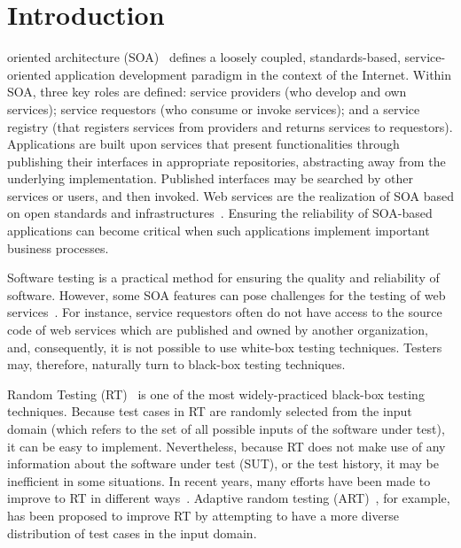 \documentclass[10pt,journal,compsoc]{IEEEtran}
\begin{document}
\maketitle

\IEEEdisplaynontitleabstractindextext


\IEEEpeerreviewmaketitle


\section{Introduction}
\label{sec:introduction}

 oriented architecture (SOA)~\cite{papazoglou2008service} defines a loosely coupled, standards-based, service-oriented application development paradigm in the context of the Internet.
Within SOA, three key roles are defined:
service providers (who  develop and own services);
service requestors (who consume or invoke services); and
a service registry (that registers services from providers and returns services to requestors).
Applications are built upon services that present functionalities through publishing their interfaces in appropriate repositories, abstracting away from the underlying implementation.
Published interfaces may be searched by other services or users, and then invoked.
Web services are the realization of SOA based on open standards and infrastructures~\cite{sun2011transaction}.
Ensuring the reliability of SOA-based applications can become critical when such applications implement important business processes.

Software testing is a practical method for ensuring the quality and reliability of software.
However, some SOA features can pose challenges for the testing of web services~\cite{bartolini2009whitening, canfora}.
For instance, service requestors often do not have access to the source code of web services which are published and owned by another organization, and, consequently, it is not possible to use white-box testing techniques.
Testers may, therefore, naturally turn to black-box testing techniques.

Random Testing (RT)~\cite{Hamlet02} is one of the most widely-practiced black-box testing techniques.
Because test cases in RT are randomly selected from the input domain (which refers to the set of all possible inputs of the software under test), it can be easy to implement.
Nevertheless, because RT does not make use of any information about the software under test (SUT), or the test history, it may be inefficient in some situations.
In recent years, many efforts have been made to improve to RT in different ways~\cite{cai2009random, chen2010adaptive, Cai07}.
Adaptive random testing (ART)~\cite{chen2010adaptive, chen2009adaptive, chen2013code, chen2018test}, for example, has been proposed to improve RT by attempting to have a more diverse distribution of test cases in the input domain.
\end{document}
